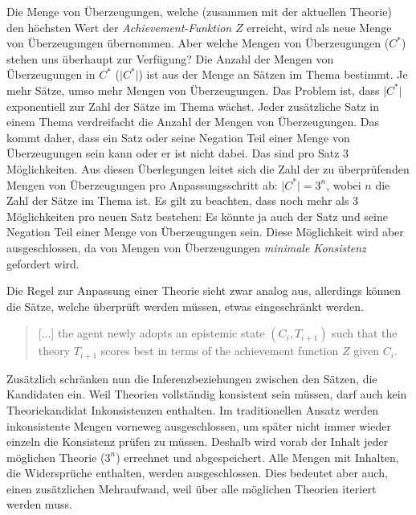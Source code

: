\documentclass{article}
\begin{document}
Die Menge von Überzeugungen, welche (zusammen mit der aktuellen Theorie) den höchsten Wert der \textit{Achievement-Funktion} $Z$ erreicht, wird als neue Menge von Überzeugungen übernommen. Aber welche Mengen von Überzeugungen ($C^*$) stehen uns überhaupt zur Verfügung? Die Anzahl der Mengen von Überzeugungen in $C^*$ ($\lvert C^* \lvert$) ist aus der Menge an Sätzen im Thema bestimmt. Je mehr Sätze, umso mehr Mengen von Überzeugungen. Das Problem ist, dass $\lvert C^* \lvert$ exponentiell zur Zahl der Sätze im Thema wächst. Jeder zusätzliche Satz in einem Thema verdreifacht die Anzahl der Mengen von Überzeugungen. Das kommt daher, dass ein Satz oder seine Negation Teil einer Menge von Überzeugungen sein kann oder er ist nicht dabei. Das sind pro Satz 3 Möglichkeiten. Aus diesen Überlegungen leitet sich die Zahl der zu überprüfenden Mengen von Überzeugungen pro Anpassungsschritt ab: $\lvert C^* \rvert = 3^n$, wobei $n$ die Zahl der Sätze im Thema ist. Es gilt zu beachten, dass noch mehr als 3 Möglichkeiten pro neuen Satz bestehen: Es könnte ja auch der Satz und seine Negation Teil einer Menge von Überzeugungen sein. Diese Möglichkeit wird aber ausgeschlossen, da von Mengen von Überzeugungen \textit{minimale Konsistenz} gefordert wird.

Die Regel zur Anpassung einer Theorie sieht zwar analog aus, allerdings können die Sätze, welche überprüft werden müssen, etwas eingeschränkt werden.

\begin{quote}
    [...] the agent newly adopts an epistemic state $(C_i, T_{i+1})$ such that the theory $T_{i+1}$ scores best in terms of the achievement function $Z$ given $C_i$.
    \autocite[S.~11]{beisbart_making_2015}
\end{quote}

Zusätzlich schränken nun die Inferenzbeziehungen zwischen den Sätzen, die Kandidaten ein. Weil Theorien vollständig konsistent sein müssen, darf auch kein Theoriekandidat Inkonsistenzen enthalten.
Im traditionellen Ansatz werden inkonsistente Mengen vorneweg ausgeschlossen, um später nicht immer wieder einzeln die Konsistenz prüfen zu müssen. Deshalb wird vorab der Inhalt jeder möglichen Theorie ($3^n$) errechnet und abgespeichert. Alle Mengen mit Inhalten, die Widersprüche enthalten, werden ausgeschlossen. Dies bedeutet aber auch, einen zusätzlichen Mehraufwand, weil über alle möglichen Theorien iteriert werden muss.
\end{document}
